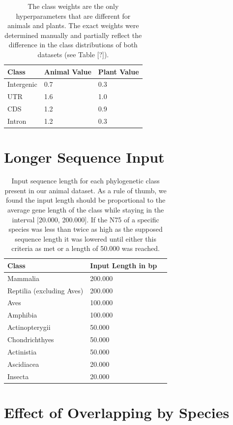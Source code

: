 \documentclass{article}
\begin{document}
\begin{table}[!h]
\renewcommand\thetable{S1}
\centering
\begin{tabular}{@{}lll@{}}
\hline
Class & Animal Value & Plant Value \\ [0.5ex]
\hline
Intergenic & 0.7 & 0.3 \\
UTR & 1.6 & 1.0 \\
CDS & 1.2 & 0.9 \\
Intron & 1.2 & 0.3 \\
\hline
\end{tabular}
\caption{The class weights are the only hyperparameters that are different for animals and plants. The exact weights were determined manually and partially reflect the difference in the class distributions of both datasets (see Table [?]).}
\end{table}


\newpage
\section{Longer Sequence Input}
\label{sec:longer}
\begin{table}[!h]
\renewcommand\thetable{S1}
\centering
\begin{tabular}{@{}lll@{}}
\hline
Class & Input Length in bp\\ [0.5ex]
\hline
Mammalia & 200.000 \\
Reptilia (excluding Aves) & 200.000 \\
Aves & 100.000 \\
Amphibia & 100.000 \\
Actinopterygii & 50.000 \\
Chondrichthyes & 50.000 \\
Actinistia & 50.000 \\
Ascidiacea & 20.000 \\
Insecta & 20.000 \\
\hline
\end{tabular}
\caption{Input sequence length for each phylogenetic class present in our animal dataset. As a rule of thumb, we found the input length should be proportional to the average gene length of the class while staying in the interval [20.000, 200.000]. If the N75 of a specific species was less than twice as high as the supposed sequence length it was lowered until either this criteria as met or a length of 50.000 was reached. }
\end{table}

\newpage
\section{Effect of Overlapping by Species}
\label{sec:overlapping}
\end{document}

